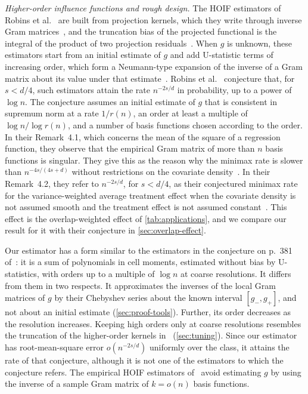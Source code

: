 \emph{Higher-order influence functions and rough design.} The HOIF
estimators of Robins et al.~\cite{hoif2008} are built from projection
kernels, which they write through inverse Gram
matrices~\cite[p.~357]{hoif2008}, and the truncation bias of the
projected functional is the integral of the product of two projection
residuals~\cite[Theorems~3.7--3.8]{hoif2008}. When $g$ is unknown,
these estimators start from an initial estimate of $g$ and add U-statistic terms of increasing
order, which form a Neumann-type expansion of the inverse of a Gram
matrix about its value under that
estimate~\cite[Theorems~3.14--3.15]{hoif2008}. Robins et
al.~\cite[p.~381]{hoif2008} conjecture that, for $s<d/4$, such
estimators attain the rate $n^{-2s/d}$ in probability, up to a power of
$\log n$. The conjecture assumes an initial estimate of $g$ that is
consistent in supremum norm at a rate $1/r(n)$, an order at least a
multiple of $\log n/\log r(n)$, and a number of basis functions chosen
according to the order. In their Remark~4.1, which concerns the mean of
the square of a regression function, they observe that the empirical
Gram matrix of more than $n$ basis functions is singular. They give this
as the reason why the minimax rate is slower than $n^{-4s/(4s+d)}$
without restrictions on the covariate
density~\cite[Remark~4.1]{hoif2008}. In their Remark~4.2, they refer
to $n^{-2s/d}$, for $s<d/4$, as their conjectured minimax rate for the
variance-weighted average treatment effect when the covariate density
is not assumed smooth and the treatment effect is not assumed
constant~\cite[Remark~4.2]{hoif2008}. This effect is the
overlap-weighted effect of \cref{tab:applications}, and we compare our
result for it with their conjecture in \cref{sec:overlap-effect}.

Our estimator has a form similar to the estimators in the conjecture on
p.~381 of~\cite{hoif2008}: it is a sum of polynomials in cell moments,
estimated without bias by U-statistics, with orders up to a multiple of
$\log n$ at coarse resolutions. It differs from them in two respects. It
approximates the inverses of the local Gram matrices of $g$ by their
Chebyshev series about the known interval $[g_-,g_+]$, and not about an
initial estimate (\cref{sec:proof-tools}). Further, its order decreases
as the resolution increases. Keeping high orders only at coarse
resolutions resembles the truncation of the higher-order kernels
in~\cite[Section~9, (9.6)]{robins} (\cref{sec:tuning}). Since our
estimator has root-mean-square error $o(n^{-2s/d})$ uniformly over the
class, it attains the rate of that conjecture, although it is not one
of the estimators to which the conjecture refers. The empirical HOIF
estimators of~\cite{liu} avoid estimating $g$ by using the inverse of a
sample Gram matrix of $k=o(n)$ basis functions.

